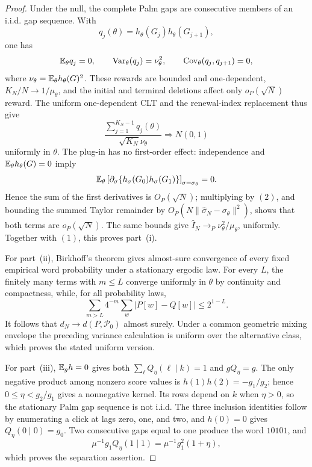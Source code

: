 \begin{proof}
Under the null, the complete Palm gaps are consecutive members of an i.i.d.
gap sequence.  With
\[
q_j(\theta)=h_\theta(G_j)h_\theta(G_{j+1}),
\]
one has
\[
\mathbb{E}_\theta q_j=0,\qquad
\operatorname{Var}_\theta(q_j)=\nu_\theta^2,
\qquad
\operatorname{Cov}_\theta(q_j,q_{j+1})=0,
\]
where $\nu_\theta=\mathbb{E}_\theta h_\theta(G)^2$.  These rewards are bounded and
one-dependent, $K_N/N\to1/\mu_\theta$, and the initial and terminal deletions
affect only $o_P(\sqrt N)$ reward.  The uniform one-dependent CLT and the
renewal-index replacement thus give
\[
\frac{\sum_{j=1}^{K_N-1}q_j(\theta)}
{\sqrt{K_N}\nu_\theta}\Rightarrow N(0,1)
\]
uniformly in $\theta$.  The plug-in has no first-order effect: independence
and $\mathbb{E}_\theta h_\theta(G)=0$ imply
\[
\mathbb{E}_\theta\left[
\partial_\sigma\{h_\sigma(G_0)h_\sigma(G_1)\}
\right]_{\sigma=\sigma_\theta}=0.
\]
Hence the sum of the first derivatives is $O_P(\sqrt N)$; multiplying by
$(2)$, and bounding the summed Taylor remainder by
$O_P(N\|\widehat\sigma_N-\sigma_\theta\|^2)$, shows that both terms are
$o_P(\sqrt N)$.  The same bounds give
$\widehat I_N\to_P\nu_\theta^2/\mu_\theta$, uniformly.  Together with
$(1)$, this proves part~\textup{(i)}.

For part~\textup{(ii)}, Birkhoff's theorem gives almost-sure convergence of
every fixed empirical word probability under a stationary ergodic law.  For
every $L$, the finitely many terms with $m\le L$ converge uniformly in
$\theta$ by continuity and compactness, while, for all probability laws,
\[
\sum_{m>L}4^{-m}\sum_w|P[w]-Q[w]|\le2^{1-L}.
\]
It follows that $d_N\to d(P,\mathcal P_0)$ almost surely.  Under a common
geometric mixing envelope the preceding variance calculation is uniform over
the alternative class, which proves the stated uniform version.

For part~\textup{(iii)}, $\mathbb{E}_g h=0$ gives both
$\sum_\ell Q_\eta(\ell\mid k)=1$ and $gQ_\eta=g$.  The only negative
product among nonzero score values is
$h(1)h(2)=-g_1/g_2$; hence $0\le\eta<g_2/g_1$ gives a nonnegative kernel.
Its rows depend on $k$ when $\eta>0$, so the stationary Palm gap sequence
is not i.i.d.  The three inclusion identities follow by enumerating a click at
lags zero, one, and two, and $h(0)=0$ gives
$Q_\eta(0\mid0)=g_0$.  Two consecutive gaps equal to one produce the word
$10101$, and
\[
\mu^{-1}g_1Q_\eta(1\mid1)
=\mu^{-1}g_1^2(1+\eta),
\]
which proves the separation assertion.


\end{proof}
